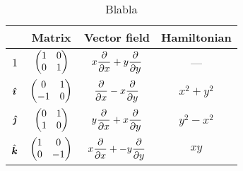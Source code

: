 \begin{table}[ht!]
    \centering
    \caption{Blabla}
    \label{tab:basis_vf}
    \begin{tabular}{cccc}
        \toprule
         & \textbf{Matrix} & \textbf{Vector field} & \textbf{Hamiltonian} \\
        \midrule
        $1$ & $\mqty(1 & 0 \\ 0 & 1) $ & $\displaystyle x\pdv{}{x} + y\pdv{}{y} $ & --- \\[0.4cm]

        $\quati$ & $\mqty(0 & 1 \\ -1 & 0) $ & $\displaystyle \pdv{}{x} - x\pdv{}{y} $ & $ x^2 + y^2 $ \\[0.4cm]

        $\quatj$ & $\mqty(0 & 1 \\ 1 & 0) $ & $\displaystyle y\pdv{}{x} + x\pdv{}{y} $ & $ y^2 - x^2 $ \\[0.4cm]

        $\quatk$ & $\mqty(1 & 0 \\ 0 & -1) $ & $\displaystyle x\pdv{}{x} + -y\pdv{}{y} $ & $ xy $\\[0.4cm]

        \bottomrule
    \end{tabular}
\end{table}

